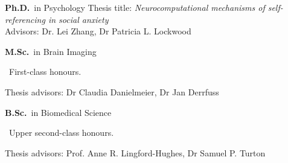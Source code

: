 
	{%
		\textbf{Ph.D.}~in Psychology}
	{%
	Thesis title: \emph{Neurocomputational mechanisms of self-referencing in social anxiety} \\
	Advisors: Dr. Lei Zhang, Dr Patricia L. Lockwood}

		{%
			\textbf{M.Sc.}~in Brain Imaging \begin{footnotesize}
			~First-class honours.
		\end{footnotesize}}
		{Thesis advisors: Dr Claudia Danielmeier, Dr Jan Derrfuss}

{%
	\textbf{B.Sc.}~in Biomedical Science \begin{footnotesize}
	~Upper second-class honours.
\end{footnotesize}}{Thesis advisors: Prof. Anne R. Lingford-Hughes, Dr Samuel P. Turton}
